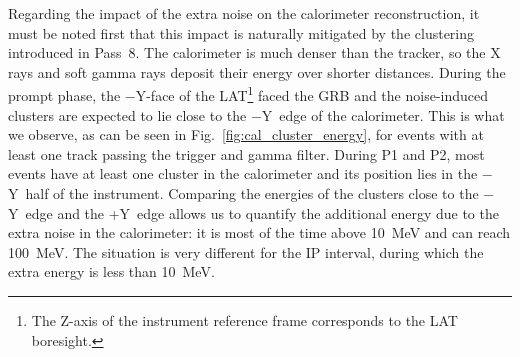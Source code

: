\documentclass[preprint]{aastex631}
\begin{document}
Regarding the impact of the extra noise on the calorimeter reconstruction, it must be noted first that this impact is naturally mitigated by the clustering introduced in Pass~8. The calorimeter is much denser than the tracker, so the X rays and soft gamma rays deposit their energy over shorter distances. During the prompt phase, the $-$Y-face of the LAT\footnote{The Z-axis of the instrument reference frame corresponds to the LAT boresight.} faced the GRB and the noise-induced clusters are expected to lie close to the $-$Y~edge of the calorimeter. This is what we observe, as can be seen in Fig.~\ref{fig:cal_cluster_energy}, for events with at least one track passing the trigger and gamma filter. During P1 and P2, most events have at least one cluster in the calorimeter and its position lies in the $-$Y~half of the instrument. Comparing the energies of the clusters close to the $-$Y~edge and the +Y~edge allows us to quantify the additional energy due to the extra noise in the calorimeter: it is most of the time above 10~MeV and can reach 100~MeV. The situation is very different for the IP interval, during which the extra energy is less than 10~MeV.
\end{document}
